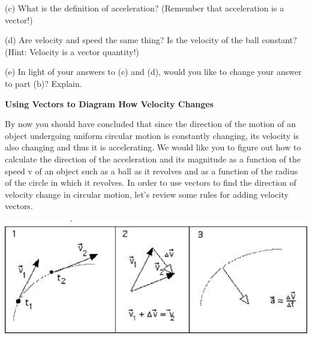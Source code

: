 (c) What is the definition of acceleration? (Remember that acceleration is a
vector!)
\vspace{20mm}

(d) Are velocity and speed the same thing? Is the velocity of the ball constant?
(Hint: Velocity is a vector quantity!)
\vspace{20mm}

(e) In light of your answers to (c) and (d), would you like to change your answer
to part (b)? Explain.
\vspace{20mm}

\textbf{Using Vectors to Diagram How Velocity Changes} 

By now you should have concluded that since the direction of the motion of an
object undergoing uniform circular motion is constantly changing, its velocity
is also changing and thus it is accelerating. We would like you to figure out
how to calculate the direction of the acceleration and its magnitude as a function
of the speed v of an object such as a ball as it revolves and as a function
of the radius of the circle in which it revolves. In order to use vectors to
find the direction of velocity change in circular motion, let's review some
rules for adding velocity vectors.

\vspace{0.3cm}
{\par\centering \includegraphics{circ_motion/circ_motion_fig1.eps} \par}
\vspace{0.3cm}

